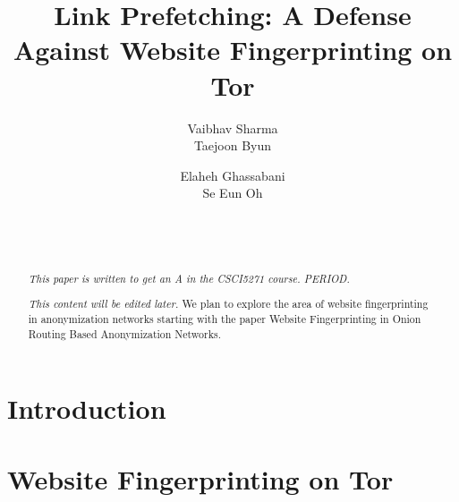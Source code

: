 \documentclass{sig-alternate-05-2015}
\begin{document}
\title{Link Prefetching: A Defense Against Website Fingerprinting on Tor }

\author{
    \alignauthor
        Vaibhav Sharma\\%
    \alignauthor
        Taejoon Byun\\
\and
    \alignauthor
        Elaheh Ghassabani\\
    \alignauthor
        Se Eun Oh\\%
\and
      \\
           \\
}

\maketitle
\begin{abstract}
\emph{This paper is written to get an A in the CSCI5271 course. PERIOD.}

\emph{This content will be edited later.} We plan to explore the area of website fingerprinting in anonymization networks starting with the paper Website Fingerprinting in Onion Routing Based Anonymization Networks.
\end{abstract}



\section{Introduction}


\section{Website Fingerprinting on Tor}

\end{document}

